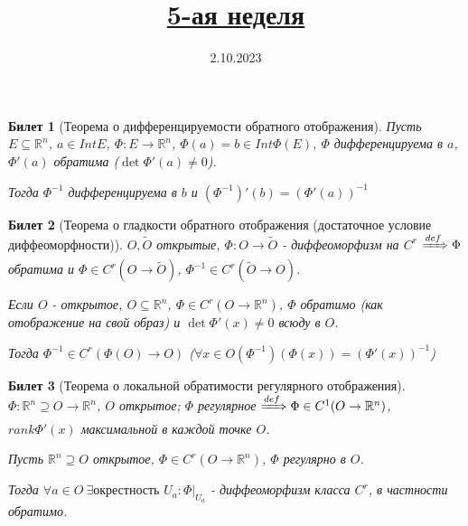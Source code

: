 \documentclass[11pt,a4paper,oneside]{scrartcl}
\title{\href{https://youtu.be/KuG517F82VE?si=f8m6ZjJHx0_MvQsf}{5-ая неделя}}
\date{2.10.2023}
\newtheorem{ticket}{Билет}
\begin{document}
\pagestyle{empty}

\maketitle

\setcounter{ticket}{15}
\addtocounter{ticket}{-1}
\begin{ticket}[Теорема о дифференцируемости обратного отображения]
    Пусть $E \subseteq \mathbb{R}^n$, $a \in IntE$, $\Phi: E \rightarrow \mathbb{R}^n$,
    $\Phi(a) = b \in Int \Phi(E)$, $\Phi$ дифференцируема в $a$,
    $\Phi'(a)$ обратима ($\det \Phi'(a) \neq 0$).

    Тогда $\Phi^{-1}$ дифференцируема в $b$ и $(\Phi^{-1})'(b) = (\Phi'(a))^{-1}$
\end{ticket}

\begin{ticket}[Теорема о гладкости обратного отображения (достаточное условие диффеоморфности)]
    $O, \tilde{O}$ открытые, $\Phi: O \rightarrow \tilde{O}$ - диффеоморфизм на $C^r$ $\xRightarrow{def} \Phi$ обратима
    и $\Phi \in C^r(O \rightarrow \tilde{O})$, $\Phi^{-1} \in C^r(\tilde{O} \rightarrow O)$.

    Если $O$ - открытое, $O \subseteq \mathbb{R}^n$, $\Phi \in C^r(O \rightarrow \mathbb{R}^n)$,
    $\Phi$ обратимо (как отображение на свой образ) и $\det \Phi'(x) \neq 0$ всюду в $O$.

    Тогда $\Phi^{-1} \in C^r(\Phi(O) \rightarrow O)$
    ($\forall x \in O (\Phi^{-1})(\Phi(x)) = (\Phi'(x))^{-1}$)
\end{ticket}

\begin{ticket}[Теорема о локальной обратимости регулярного отображения]
    $\Phi: \mathbb{R}^n \supseteq O \rightarrow \mathbb{R}^n$, $O$ открытое;
    $\Phi$ регулярное $\xRightarrow{def} \Phi \in C^1(O \rightarrow \mathbb{R}^n)$,
    $rank \Phi'(x)$ максимальной в каждой точке $O$.

    Пусть $\mathbb{R}^n \supseteq O$ открытое, $\Phi \in C^r(O \rightarrow \mathbb{R}^n)$,
    $\Phi$ регулярно в $O$.

    Тогда $\forall a \in O \ \exists \text{окрестность } U_a: \Phi |_{U_a}$
    - диффеоморфизм класса $C^r$, в частности обратимо.
\end{ticket}
\end{document}
